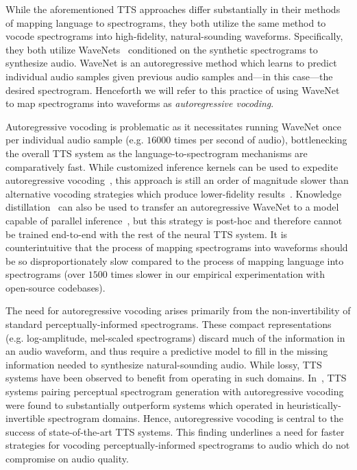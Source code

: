 \documentclass[a4paper]{article}
\begin{document}
While the aforementioned TTS approaches differ substantially in their methods of mapping language to spectrograms, they both utilize the same method to vocode spectrograms into high-fidelity, natural-sounding waveforms. 
Specifically, they both utilize WaveNets~\cite{oord2016wavenet} conditioned on the synthetic spectrograms to synthesize audio. 
WaveNet is an autoregressive method which learns to predict individual audio samples given previous audio samples and---in this case---the desired spectrogram. 
Henceforth we will refer to this practice of using WaveNet to map spectrograms into waveforms as \emph{autoregressive vocoding}. 

Autoregressive vocoding is problematic as it necessitates running WaveNet once per individual audio sample (e.g. $16000$ times per second of audio), bottlenecking the overall TTS system as the language-to-spectrogram mechanisms are comparatively fast. 
While customized inference kernels can be used to expedite autoregressive vocoding~\cite{arik2017deep}, this approach is still an order of magnitude slower than alternative vocoding strategies which produce lower-fidelity results~\cite{ping2017deep}. 
Knowledge distillation~\cite{hinton2015distilling} can also be used to transfer an autoregressive WaveNet to a model capable of parallel inference~\cite{oord2017parallel}, 
but this strategy is post-hoc and therefore cannot be trained end-to-end with the rest of the neural TTS system.
It is counterintuitive that the process of mapping spectrograms into waveforms should be so disproportionately slow compared to the process of mapping language into spectrograms (over $1500$ times slower in our empirical experimentation with open-source codebases).


The need for autoregressive vocoding arises primarily from the non-invertibility of standard perceptually-informed spectrograms.
These compact representations (e.g. log-amplitude, mel-scaled spectrograms) discard much of the information in an audio waveform, 
and thus require a predictive model to fill in the missing information needed to synthesize natural-sounding audio.
While lossy, TTS systems have been observed to benefit from operating in such domains.
In~\cite{ping2017deep}, TTS systems pairing perceptual spectrogram generation with autoregressive vocoding were found to substantially outperform systems which operated in heuristically-invertible spectrogram domains.
Hence, autoregressive vocoding is central to the success of state-of-the-art TTS systems.
This finding underlines a need for faster strategies for vocoding perceptually-informed spectrograms to audio which do not compromise on audio quality.
\end{document}
